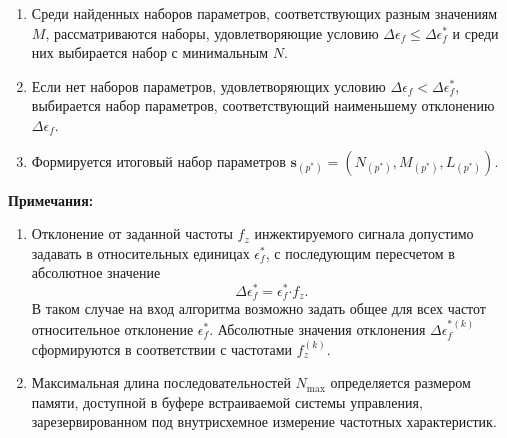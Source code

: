 \begin{enumerate}
\begin{enumerate}
        \item Если нет значений ${f^{'}_z}$, удовлетворяющих условию ${\epsilon_f < \epsilon^{*}_f}$, выбирается набор параметров ${N, M, L}$, соответствующий наименьшему отклонению ${\Delta\epsilon_f}$.
    \end{enumerate}
    \item Среди найденных наборов параметров, соответствующих разным значениям $M$, рассматриваются наборы, удовлетворяющие условию ${\Delta\epsilon_f \leq \Delta\epsilon^{*}_f}$ и среди них выбирается набор с минимальным $N$.
    \item Если нет наборов параметров, удовлетворяющих условию ${\Delta\epsilon_f < \Delta\epsilon^{*}_f}$, выбирается набор параметров, соответствующий наименьшему отклонению ${\Delta\epsilon_f}$.
    \item Формируется итоговый набор параметров ${\mathbf{s}_{(p^{*})} = \left( N_{(p^{*})}, M_{(p^{*})}, L_{(p^{*})} \right)}$.
\end{enumerate}

\textbf{Примечания:}
\begin{enumerate}
    \item Отклонение от заданной частоты ${f_z}$ инжектируемого сигнала допустимо задавать в относительных единицах ${\epsilon^{*}_{f}}$, с последующим пересчетом в абсолютное значение
    \begin{equation*}
        \Delta\epsilon^{*}_{f} = \epsilon^{*}_{f} \mathord{\cdot} f_z.
    \end{equation*}
    В таком случае на вход алгоритма возможно задать общее для всех частот относительное отклонение ${\epsilon^{*}_f}$. Абсолютные значения отклонения ${\Delta\epsilon^{*(k)}_f}$ сформируются в соответствии с частотами ${f^{(k)}_z}$.
    
    \item Максимальная длина последовательностей ${N_\text{max}}$ определяется размером памяти, доступной в буфере встраиваемой системы управления, зарезервированном под внутрисхемное измерение частотных характеристик.
\end{enumerate}

